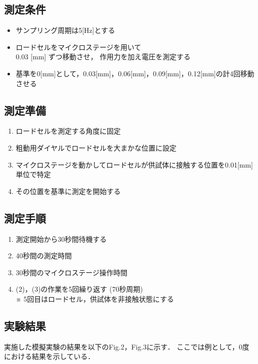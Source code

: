 \documentclass[twocolumn,a4j]{jsarticle}
\begin{document}
\subsection{測定条件}
    \begin{itemize}
        \item サンプリング周期は5[Hz]とする
        \item ロードセルをマイクロステージを用いて\\
              0.03 [mm] ずつ移動させ，
              作用力を加え電圧を測定する
        \item 基準を0[mm]として，0.03[mm]，0.06[mm]，0.09[mm]，0.12[mm]の計4回移動させる
    \end{itemize}

\subsection{測定準備}
    \begin{enumerate}[(1)]
        \item ロードセルを測定する角度に固定
        \item 粗動用ダイヤルでロードセルを大まかな位置に設定
        \item マイクロステージを動かしてロードセルが供試体に接触する位置を0.01[mm]単位で特定
        \item その位置を基準に測定を開始する
    \end{enumerate}

\subsection{測定手順}
    \begin{enumerate}[(1)]
        \item 測定開始から30秒間待機する
        \item 40秒間の測定時間
        \item 30秒間のマイクロステージ操作時間
        \item (2)，(3)の作業を5回繰り返す (70秒周期)\\
              ※ 5回目はロードセル，供試体を非接触状態にする
    \end{enumerate}

\newpage

\subsection{実験結果}
実施した模擬実験の結果を以下のFig.2，Fig.3に示す．
ここでは例として，0度における結果を示している．
\end{document}
